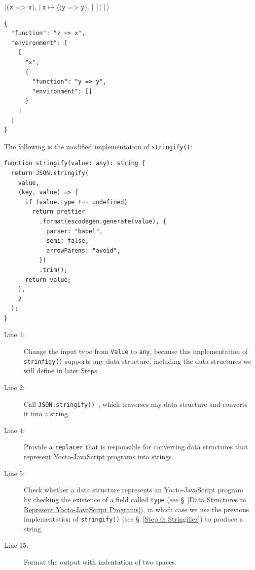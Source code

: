 \documentclass[12pt, oneside]{book}
\begin{document}
\begin{center}
$\langle \texttt{(z => x)}, [\texttt{x} \mapsto \langle \texttt{(y => y)}, [] \rangle] \rangle$
\end{center}

\begin{verbatim}
{
  "function": "z => x",
  "environment": [
    [
      "x",
      {
        "function": "y => y",
        "environment": []
      }
    ]
  ]
}
\end{verbatim}

The following is the modified implementation of \texttt{stringify()}:

\begin{verbatim}
function stringify(value: any): string {
  return JSON.stringify(
    value,
    (key, value) => {
      if (value.type !== undefined)
        return prettier
          .format(escodegen.generate(value), {
            parser: "babel",
            semi: false,
            arrowParens: "avoid",
          })
          .trim();
      return value;
    },
    2
  );
}
\end{verbatim}

\begin{description}
\item [Line 1:]

Change the input type from \texttt{Value} to \texttt{any}, because this implementation of \texttt{strinfigy()} supports any data structure, including the data structures we will define in later Steps.

\item [Line 2:]

Call \texttt{JSON.stringify()}~\cite{javascript-json-stringify}, which traverses any data structure and converts it into a string.

\item [Line 4:]

Provide a \texttt{replacer} that is responsible for converting data structures that represent Yocto-JavaScript programs into strings.

\item [Line 5:]

Check whether a data structure represents an Yocto-JavaScript program by checking the existence of a field called \texttt{type} (see §~\ref{Data Structures to Represent Yocto-JavaScript Programs}), in which case we use the previous implementation of \texttt{stringify()} (see §~\ref{Step 0: Stringifier}) to produce a string.

\item [Line 15:]

Format the output with indentation of two spaces.
\end{description}
\end{document}
